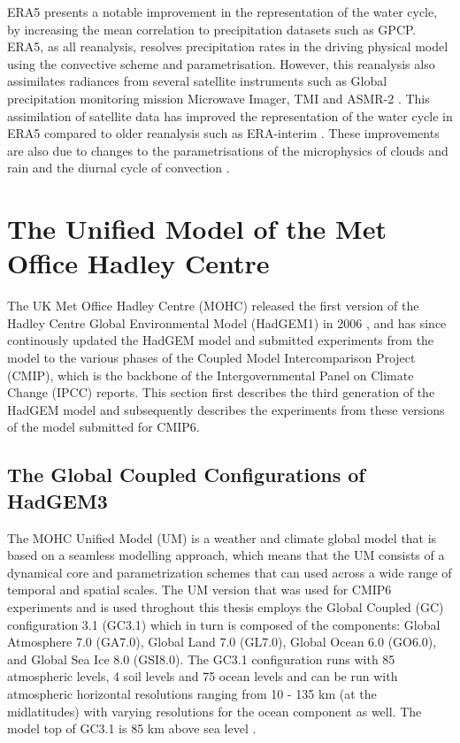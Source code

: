 ERA5 presents a notable improvement in the representation of the water cycle, by increasing the mean correlation to precipitation datasets such as GPCP. 
ERA5, as all reanalysis, resolves precipitation rates in the driving physical model using the convective scheme and parametrisation. However, this reanalysis also assimilates radiances from several satellite instruments such as Global precipitation monitoring mission Microwave Imager, TMI and ASMR-2 \cite{era5hersbach}. This assimilation of satellite data has improved the representation of the water cycle in ERA5 compared to older reanalysis such as ERA-interim \citep[e.g.][]{henin2018assessing}. These improvements are also due to changes to the parametrisations of the microphysics of clouds and rain \citep{forbes2014} and the diurnal cycle of convection \citep{bechtold2014}. 




\section{The Unified Model of the Met Office Hadley Centre}\label{sq:modeldata}

The UK Met Office Hadley Centre (MOHC) released the first version of the Hadley Centre Global Environmental Model (HadGEM1) in 2006 \citep{johns2006}, and has since continously updated the HadGEM model and submitted experiments from the model to the various phases of the Coupled Model Intercomparison Project (CMIP), which is the backbone of the Intergovernmental Panel on Climate Change (IPCC) reports. This section first describes the third generation of the HadGEM model and subsequently describes the experiments from these versions of the model submitted for CMIP6.  



\subsection{The Global Coupled Configurations of HadGEM3}

The MOHC Unified Model (UM) is a weather and climate global model that is based on a seamless modelling approach, which means that the UM consists of a dynamical core and parametrization schemes that can used across a wide range of temporal and spatial scales. 
The UM version that was used for CMIP6 experiments and is used throghout this thesis employs the Global Coupled (GC) configuration 3.1 (GC3.1) \citep{williams2018,walters2019} which in turn is composed of the components: Global Atmosphere 7.0 (GA7.0), Global Land 7.0
(GL7.0), Global Ocean 6.0 (GO6.0), and Global Sea Ice 8.0 (GSI8.0).
The GC3.1 configuration runs with 85 atmospheric levels, 4 soil levels and 75 ocean levels and can be run with atmospheric horizontal resolutions ranging from 10 - 135 km (at the midlatitudes) with varying resolutions for the ocean component as well. The model top of GC3.1 is 85 km above sea level \citep{walters2019}. 
 

